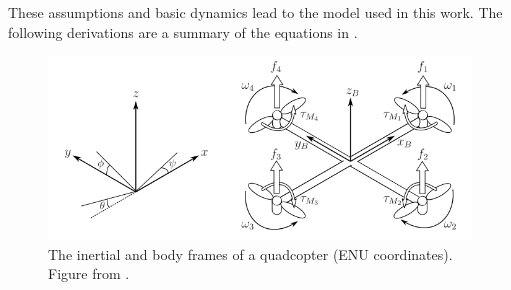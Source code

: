These assumptions and basic dynamics lead to the model used in this work.
The following derivations are a summary of the equations in \cite{}.

\begin{figure}[htbp]
  \centering
  \includegraphics[width=\linewidth]{img/reference_frames.png}
  \caption{The inertial and body frames of a quadcopter (ENU coordinates). Figure from \cite{TODO}.}
  \label{fig:reference_frames}
\end{figure}

